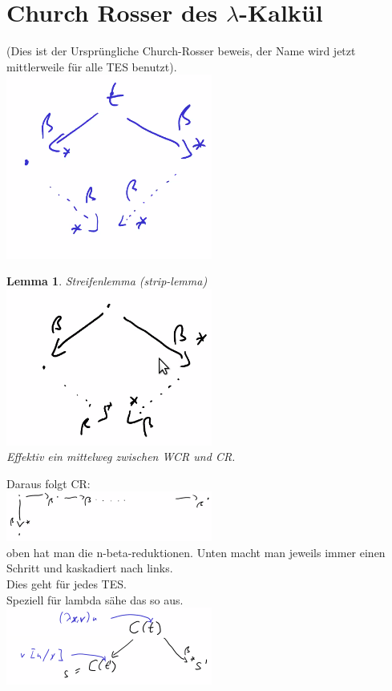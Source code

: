 \documentclass{article}
\newtheorem{lemma}{Lemma}[section]
\theoremstyle{definition}
\begin{document}
	\section{Church Rosser des $\lambda$-Kalkül}
	(Dies ist der Ursprüngliche Church-Rosser beweis, der Name wird jetzt mittlerweile für alle TES benutzt).\\
	\includegraphics[width=256px]{images/KonfluenzLambda.png}\\
	\begin{lemma} Streifenlemma (strip-lemma)\\
	\includegraphics[width=256px]{images/streifenlemma.png}\\
	Effektiv ein mittelweg zwischen WCR und CR.
	\end{lemma}
	Daraus folgt CR:\\
	\includegraphics[width=256px]{images/StreifenGenau.png}\\
	oben hat man die n-beta-reduktionen. Unten macht man jeweils immer einen Schritt und kaskadiert nach links.\\
	Dies geht für jedes TES.\\
	Speziell für lambda sähe das so aus.\\
	\includegraphics[width=256px]{images/lambdaStreifenlemma.png}\\
\end{document}
